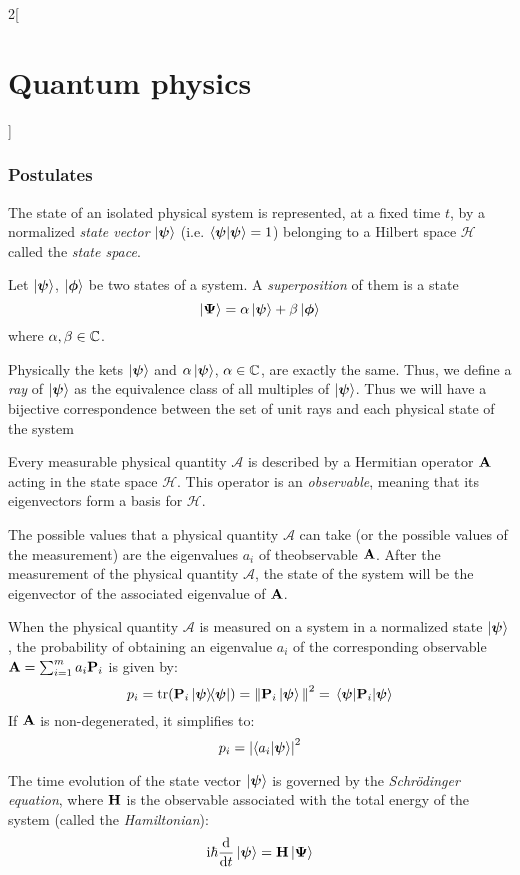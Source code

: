 \documentclass[../../../main.tex]{subfiles}
\begin{document}
\begin{multicols}{2}[\section{Quantum physics}]
  \subsubsection{Postulates}
  \begin{definition}[Postulate I]
    The state of an isolated physical system is represented, at a fixed time $t$, by a normalized \emph{state vector} $\ket{\boldsymbol{\mathrm{\psi}}}$ (i.e. $\braket{\boldsymbol{\mathrm{\psi}}}{\boldsymbol{\mathrm{\psi}}}=1$) belonging to a Hilbert space $\mathcal{H}$ called the \emph{state space}.
  \end{definition}
  \begin{definition}
    Let $\ket{\boldsymbol{\mathrm{\psi}}}$, $\ket{\boldsymbol{\mathrm{\phi}}}$ be two states of a system. A \emph{superposition} of them is a state $$\ket{\boldsymbol{\mathrm{\Psi}}}=\alpha\ket{\boldsymbol{\mathrm{\psi}}}+\beta\ket{\boldsymbol{\mathrm{\phi}}}$$ where $\alpha,\beta\in\mathbb{C}$.
  \end{definition}
  \begin{definition}
    Physically the kets $\ket{\boldsymbol{\mathrm{\psi}}}$ and $\alpha\ket{\boldsymbol{\mathrm{\psi}}}$, $\alpha\in\mathbb{C}$, are exactly the same. Thus, we define a \emph{ray} of $\ket{\boldsymbol{\mathrm{\psi}}}$ as the equivalence class of all multiples of $\ket{\boldsymbol{\mathrm{\psi}}}$. Thus we will have a bijective correspondence between the set of unit rays and each physical state of the system
  \end{definition}
  \begin{definition}[Postulate II]
    Every measurable physical quantity $\mathcal{A}$ is described by a Hermitian operator $\boldsymbol{\mathrm{A}}$ acting in the state space $\mathcal{H}$. This operator is an \emph{observable}, meaning that its eigenvectors form a basis for $\mathcal{H}$.
  \end{definition}
  \begin{definition}
    The possible values that a physical quantity $\mathcal{A}$ can take (or the possible values of the measurement) are the eigenvalues $a_i$ of theobservable $\boldsymbol{\mathrm{A}}$. After the measurement of the physical quantity $\mathcal{A}$, the state of the system will be the eigenvector of the associated eigenvalue of $\boldsymbol{\mathrm{A}}$.
  \end{definition}
  \begin{definition}[Postulate IV]
    When the physical quantity $\mathcal{A}$ is measured on a system in a normalized state $\ket{\boldsymbol{\mathrm{\psi}}}$, the probability of obtaining an eigenvalue $a_i$ of the corresponding observable $\boldsymbol{\mathrm{A}}=\sum_{i=1}^ma_i\boldsymbol{\mathrm{P}}_i$ is given by:
    $$p_i=\trace(\vf{P}_i\dyad{\vf\psi}{\vf\psi})={\norm{\vf{P}_i\ket{\vf\psi}}}^2=\mel{\vf\psi}{\vf{P}_i}{\vf\psi}$$
    If $\boldsymbol{\mathrm{A}}$ is non-degenerated, it simplifies to: $$p_i={\abs{\braket{a_i}{\boldsymbol{\mathrm{\psi}}}}}^2$$
  \end{definition}
  \begin{definition}[Postulate V]
    The time evolution of the state vector $\ket{\boldsymbol{\mathrm{\psi}}}$ is governed by the \emph{Schrödinger equation}, where $\boldsymbol{\mathrm{H}}$ is the observable associated with the total energy of the system (called the \emph{Hamiltonian}): $$\mathrm{i} \hbar\dv{}{t}\ket{\boldsymbol{\mathrm{\psi}}}=\boldsymbol{\mathrm{H}}\ket{\boldsymbol{\mathrm{\Psi}}}$$
  \end{definition}
\end{multicols}
\end{document}

